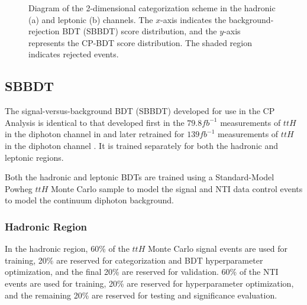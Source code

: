 \begin{figure}[htbp]
  \centering
  \caption{Diagram of the 2-dimensional categorization scheme in the hadronic (a) and leptonic (b) channels. The $x$-axis indicates the background-rejection BDT (SBBDT) score distribution, and the $y$-axis represents the CP-BDT score distribution. The shaded region indicates rejected events.}
  \label{fig:cartoon}
\end{figure}

\subsection{SBBDT}

The signal-versus-background BDT (SBBDT) developed for use in the CP Analysis is identical to that developed first in the $79.8 fb^{-1}$ measurements of $ttH$ in the diphoton channel \cite{ttH} in and later retrained for $139 fb^{-1}$ measurements of $ttH$ in the diphoton channel \cite{ATLAS-CONF-2019-004}. It is trained separately for both the hadronic and leptonic regions.

Both the hadronic and leptonic BDTs are trained using a Standard-Model Powheg $ttH$ Monte Carlo sample to model the signal and NTI data control events to model the continuum diphoton background.

\subsubsection{Hadronic Region} \label{sec:SBBDThad} 
In the hadronic region, 60\% of the $ttH$ Monte Carlo signal events are used for training, 20\% are reserved for categorization and BDT hyperparameter optimization, and the final 20\% are reserved for validation. 60\% of the NTI events are used for training, 20\% are reserved for hyperparameter optimization, and the remaining 20\% are reserved for testing and significance evaluation.

